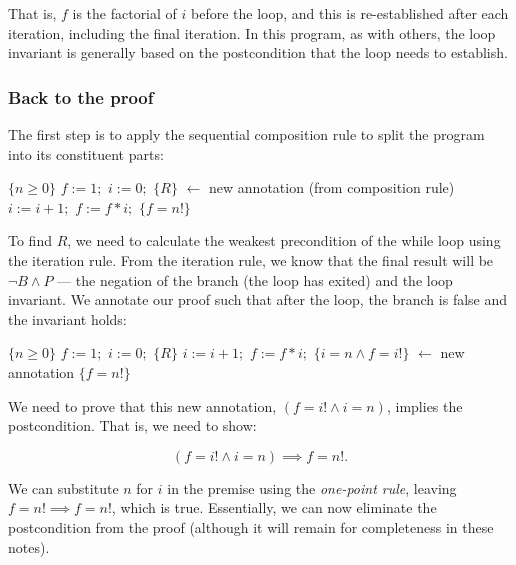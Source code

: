 \begin{example}
That is, $f$ is the factorial of $i$ before the loop, and this is re-established after each iteration, including the final iteration. In this program, as with others, the loop invariant is generally based on the postcondition that the loop needs to establish.

\subsubsection*{Back to the proof}

The first step is to apply the sequential composition rule to split the program into its constituent parts:

\begin{algorithmic}[1]
\State $\{n \geq 0\}$
\State $f := 1;$
\State $i := 0;$
\State $\{R\}$        \hspace{20mm} $\leftarrow$ new annotation (from composition rule)
   \State $i := i + 1;$
   \State $f := f * i;$
\EndWhile
\State $\{f = n!\}$
\end{algorithmic}

To find $R$, we need to calculate the weakest precondition of the while loop using the iteration rule. From the iteration rule, we know that the final result will be $\neg B \land P$ --- the negation of the branch (the loop has exited) and the loop invariant. We annotate our proof such that after the loop, the branch is false and the invariant holds:

\begin{algorithmic}[1]
\State $\{n \geq 0\}$
\State $f := 1;$
\State $i := 0;$
\State $\{R\}$
   \State $i := i + 1;$
   \State $f := f * i;$
\EndWhile
\State $\{i = n \land f = i! \}$  \hspace{20mm} $\leftarrow$ new annotation
\State $\{f = n!\}$
\end{algorithmic}

We need to prove that this new annotation, $(f = i! \land i = n)$, implies the postcondition. That is, we need to show:

\begin{displaymath}
 (f = i! \land i = n) \implies f = n!.
\end{displaymath}

We can substitute $n$ for $i$ in the premise using the \emph{one-point rule},  leaving $f = n! \implies f = n!$, which is true. Essentially, we can now eliminate the postcondition from the proof (although it will remain for completeness in these notes).


\end{example}
